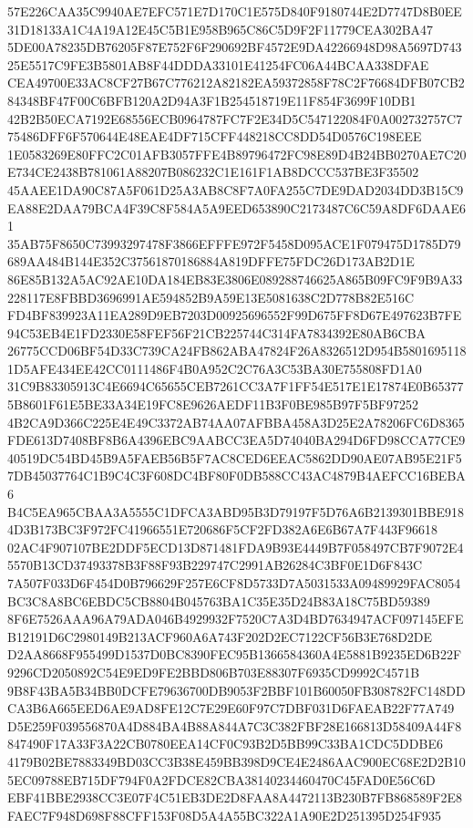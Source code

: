 \documentclass[UTF8,fontset=fandol,zihao=-4,a4paper]{ctexart}
\begin{document}
{{57E226CAA35C9940AE7EFC571E7D170C1E575D840F9180744E2D7747D8B0EE31D18133A1C4A19A12E45C5B1E958B965C86C5D9F2F11779CEA302BA47
5DE00A78235DB76205F87E752F6F290692BF4572E9DA42266948D98A5697D74325E5517C9FE3B5801AB8F44DDDA33101E41254FC06A44BCAA338DFAE
CEA49700E33AC8CF27B67C776212A82182EA59372858F78C2F76684DFB07CB284348BF47F00C6BFB120A2D94A3F1B254518719E11F854F3699F10DB1
42B2B50ECA7192E68556ECB0964787FC7F2E34D5C547122084F0A002732757C775486DFF6F570644E48EAE4DF715CFF448218CC8DD54D0576C198EEE
1E0583269E80FFC2C01AFB3057FFE4B89796472FC98E89D4B24BB0270AE7C20E734CE2438B781061A88207B086232C1E161F1AB8DCCC537BE3F35502
45AAEE1DA90C87A5F061D25A3AB8C8F7A0FA255C7DE9DAD2034DD3B15C9EA88E2DAA79BCA4F39C8F584A5A9EED653890C2173487C6C59A8DF6DAAE61
35AB75F8650C73993297478F3866EFFFE972F5458D095ACE1F079475D1785D79689AA484B144E352C37561870186884A819DFFE75FDC26D173AB2D1E
86E85B132A5AC92AE10DA184EB83E3806E089288746625A865B09FC9F9B9A33228117E8FBBD3696991AE594852B9A59E13E5081638C2D778B82E516C
FD4BF839923A11EA289D9EB7203D00925696552F99D675FF8D67E497623B7FE94C53EB4E1FD2330E58FEF56F21CB225744C314FA7834392E80AB6CBA
26775CCD06BF54D33C739CA24FB862ABA47824F26A8326512D954B58016951181D5AFE434EE42CC0111486F4B0A952C2C76A3C53BA30E755808FD1A0
31C9B83305913C4E6694C65655CEB7261CC3A7F1FF54E517E1E17874E0B653775B8601F61E5BE33A34E19FC8E9626AEDF11B3F0BE985B97F5BF97252
4B2CA9D366C225E4E49C3372AB74AA07AFBBA458A3D25E2A78206FC6D8365FDE613D7408BF8B6A4396EBC9AABCC3EA5D74040BA294D6FD98CCA77CE9
40519DC54BD45B9A5FAEB56B5F7AC8CED6EEAC5862DD90AE07AB95E21F57DB45037764C1B9C4C3F608DC4BF80F0DB588CC43AC4879B4AEFCC16BEBA6
B4C5EA965CBAA3A5555C1DFCA3ABD95B3D79197F5D76A6B2139301BBE9184D3B173BC3F972FC41966551E720686F5CF2FD382A6E6B67A7F443F96618
02AC4F907107BE2DDF5ECD13D871481FDA9B93E4449B7F058497CB7F9072E45570B13CD37493378B3F88F93B229747C2991AB26284C3BF0E1D6F843C
7A507F033D6F454D0B796629F257E6CF8D5733D7A5031533A09489929FAC8054BC3C8A8BC6EBDC5CB8804B045763BA1C35E35D24B83A18C75BD59389
8F6E7526AAA96A79ADA046B4929932F7520C7A3D4BD7634947ACF097145EFEB12191D6C2980149B213ACF960A6A743F202D2EC7122CF56B3E768D2DE
D2AA8668F955499D1537D0BC8390FEC95B1366584360A4E5881B9235ED6B22F9296CD2050892C54E9ED9FE2BBD806B703E88307F6935CD9992C4571B
9B8F43BA5B34BB0DCFE79636700DB9053F2BBF101B60050FB308782FC148DDCA3B6A665EED6AE9AD8FE12C7E29E60F97C7DBF031D6FAEAB22F77A749
D5E259F039556870A4D884BA4B88A844A7C3C382FBF28E166813D58409A44F8847490F17A33F3A22CB0780EEA14CF0C93B2D5BB99C33BA1CDC5DDBE6
4179B02BE7883349BD03CC3B38E459BB398D9CE4E2486AAC900EC68E2D2B105EC09788EB715DF794F0A2FDCE82CBA38140234460470C45FAD0E56C6D
EBF41BBE2938CC3E07F4C51EB3DE2D8FAA8A4472113B230B7FB868589F2E8FAEC7F948D698F88CFF153F08D5A4A55BC322A1A90E2D251395D254F935
}}
\end{document}
